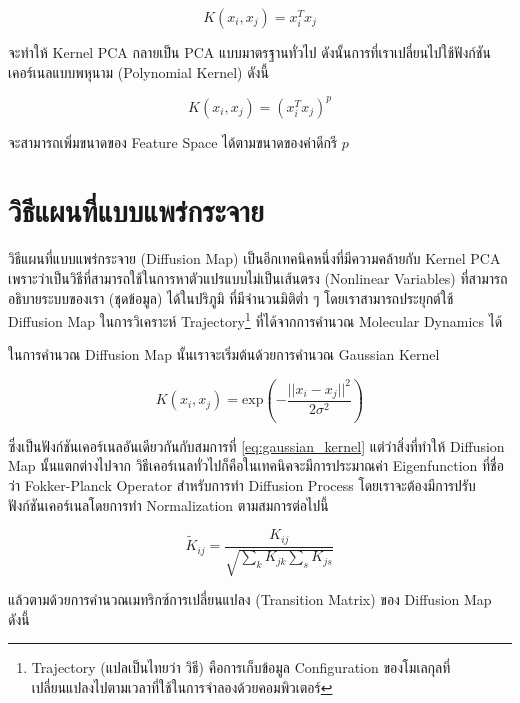 \begin{equation}
    K(x_{i},x_{j}) = x^{T}_{i}x_{j} 
\end{equation}

\noindent จะทำให้ Kernel PCA กลายเป็น PCA แบบมาตรฐานทั่วไป ดังนั้นการที่เราเปลี่ยนไปใช้ฟังก์ชันเคอร์เนลแบบพหุนาม (Polynomial 
Kernel) ดังนี้

\begin{equation} 
    K(x_{i},x_{j}) = (x^{T}_{i}x_{j})^{p}
\end{equation}

\noindent จะสามารถเพิ่มขนาดของ Feature Space ได้ตามขนาดของค่าดีกรี $p$

\section{วิธีแผนที่แบบแพร่กระจาย}
\label{sec:diff_map}

วิธีแผนที่แบบแพร่กระจาย (Diffusion Map)\autocite{coifman2005,coifman2006} เป็นอีกเทคนิคหนึ่งที่มีความคล้ายกับ Kernel PCA 
เพราะว่าเป็นวิธีที่สามารถใช้ในการหาตัวแปรแบบไม่เป็นเส้นตรง (Nonlinear Variables) ที่สามารถอธิบายระบบของเรา (ชุดข้อมูล) ได้ในปริภูมิ%
ที่มีจำนวนมิติต่ำ ๆ โดยเราสามารถประยุกต์ใช้ Diffusion Map ในการวิเคราะห์ Trajectory\footnote{Trajectory (แปลเป็นไทยว่า วิธี) 
คือการเก็บข้อมูล Configuration ของโมเลกุลที่เปลี่ยนแปลงไปตามเวลาที่ใช้ในการจำลองด้วยคอมพิวเตอร์} ที่ได้จากการคำนวณ Molecular 
Dynamics ได้

ในการคำนวณ Diffusion Map นั้นเราจะเริ่มต้นด้วยการคำนวณ Gaussian Kernel

\begin{equation}
    K(x_{i}, x_{j}) = \mathrm{exp}\left( -\frac{||x_i-x_j||^2}{2\sigma^2} \right)
\end{equation}

\noindent ซึ่งเป็นฟังก์ชันเคอร์เนลอันเดียวกันกับสมการที่ \ref{eq:gaussian_kernel} แต่ว่าสิ่งที่ทำให้ Diffusion Map นั้นแตกต่างไปจาก%
วิธีเคอร์เนลทั่วไปก็คือในเทคนิคจะมีการประมาณค่า Eigenfunction ที่ชื่อว่า Fokker-Planck Operator สำหรับการทำ Diffusion Process%
\autocite{trstanova2020} โดยเราจะต้องมีการปรับฟังก์ชันเคอร์เนลโดยการทำ Normalization\autocite{nadler2006} ตามสมการต่อไปนี้

\begin{equation}
    \tilde{K}_{ij} = \frac{K_{ij}}{\sqrt{\sum_{k}K_{jk} \sum_{s}K_{js}}}
\end{equation}

\noindent แล้วตามด้วยการคำนวณเมทริกซ์การเปลี่ยนแปลง (Transition Matrix) ของ Diffusion Map ดังนี้

